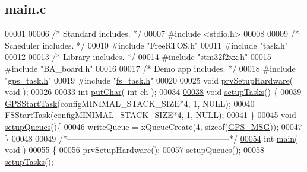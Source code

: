 \hypertarget{main_8c_source}{\subsection{main.\+c}
\label{main_8c_source}
}

\begin{DoxyCode}
00001 
00006 \textcolor{comment}{/* Standard includes. */}
00007 \textcolor{preprocessor}{#include <stdio.h>}
00008 
00009 \textcolor{comment}{/* Scheduler includes. */}
00010 \textcolor{preprocessor}{#include "FreeRTOS.h"}
00011 \textcolor{preprocessor}{#include "task.h"}
00012 
00013 \textcolor{comment}{/* Library includes. */}
00014 \textcolor{preprocessor}{#include "stm32f2xx.h"}
00015 \textcolor{preprocessor}{#include "BA\_board.h"}
00016 
00017 \textcolor{comment}{/* Demo app includes. */}
00018 \textcolor{preprocessor}{#include "\hyperlink{gps__task_8h}{gps\_task.h}"}
00019 \textcolor{preprocessor}{#include "\hyperlink{fs__task_8h}{fs\_task.h}"}
00020 
00025 \textcolor{keywordtype}{void} \hyperlink{main_8c_a70d35396e40a379083f623fc98817ce5}{prvSetupHardware}( \textcolor{keywordtype}{void} );
00026 
00033 \textcolor{keywordtype}{int} \hyperlink{main_8c_aa2bb3bba4ac29312751cdf8d20d86c5b}{putChar}( \textcolor{keywordtype}{int} ch );
00034 
\hypertarget{main_8c_source_l00038}{}\hyperlink{main_8c_a22d2ba743406e0f67f8fa5d6df6e2891}{00038} \textcolor{keywordtype}{void} \hyperlink{main_8c_a22d2ba743406e0f67f8fa5d6df6e2891}{setupTasks}() \{
00039   \hyperlink{gps__task_8c_ac8c08e783e9eabb617e98e4af988aeed}{GPSStartTask}(configMINIMAL\_STACK\_SIZE*4, 1, NULL);
00040   \hyperlink{fs__task_8c_a67c975ae61cf5db912f17b454b2713c7}{FSStartTask}(configMINIMAL\_STACK\_SIZE*4, 1, NULL);
00041 \}
\hypertarget{main_8c_source_l00045}{}\hyperlink{main_8c_a631058ae679448e6987400bfd4173c03}{00045} \textcolor{keywordtype}{void} \hyperlink{main_8c_a631058ae679448e6987400bfd4173c03}{setupQueues}()\{
00046   writeQueue = xQueueCreate(4, \textcolor{keyword}{sizeof}(\hyperlink{structGPS__MSG}{GPS\_MSG}));
00047 \}
00048 
00049 \textcolor{comment}{/*-----------------------------------------------------------*/}
\hypertarget{main_8c_source_l00054}{}\hyperlink{main_8c_a840291bc02cba5474a4cb46a9b9566fe}{00054} \textcolor{keywordtype}{int} \hyperlink{main_8c_a840291bc02cba5474a4cb46a9b9566fe}{main}( \textcolor{keywordtype}{void} )
00055 \{
00056   \hyperlink{main_8c_a70d35396e40a379083f623fc98817ce5}{prvSetupHardware}();
00057   \hyperlink{main_8c_a631058ae679448e6987400bfd4173c03}{setupQueues}();
00058   \hyperlink{main_8c_a22d2ba743406e0f67f8fa5d6df6e2891}{setupTasks}();

\end{DoxyCode}
